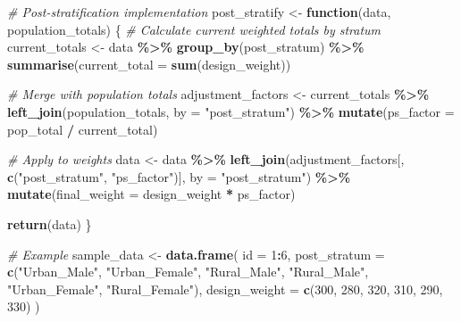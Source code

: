 \documentclass[
]{article}
\newenvironment{Shaded}{\begin{snugshade}}{\end{snugshade}}
\newcommand{\AttributeTok}[1]{\textcolor[rgb]{0.13,0.29,0.53}{#1}}
\newcommand{\CommentTok}[1]{\textcolor[rgb]{0.56,0.35,0.01}{\textit{#1}}}
\newcommand{\ControlFlowTok}[1]{\textcolor[rgb]{0.13,0.29,0.53}{\textbf{#1}}}
\newcommand{\DecValTok}[1]{\textcolor[rgb]{0.00,0.00,0.81}{#1}}
\newcommand{\FunctionTok}[1]{\textcolor[rgb]{0.13,0.29,0.53}{\textbf{#1}}}
\newcommand{\NormalTok}[1]{#1}
\newcommand{\OtherTok}[1]{\textcolor[rgb]{0.56,0.35,0.01}{#1}}
\newcommand{\SpecialCharTok}[1]{\textcolor[rgb]{0.81,0.36,0.00}{\textbf{#1}}}
\newcommand{\StringTok}[1]{\textcolor[rgb]{0.31,0.60,0.02}{#1}}
\begin{document}
\begin{Shaded}
\begin{Highlighting}[]
\CommentTok{\# Post{-}stratification implementation}
\NormalTok{post\_stratify }\OtherTok{\textless{}{-}} \ControlFlowTok{function}\NormalTok{(data, population\_totals) \{}
  \CommentTok{\# Calculate current weighted totals by stratum}
\NormalTok{  current\_totals }\OtherTok{\textless{}{-}}\NormalTok{ data }\SpecialCharTok{\%\textgreater{}\%}
    \FunctionTok{group\_by}\NormalTok{(post\_stratum) }\SpecialCharTok{\%\textgreater{}\%}
    \FunctionTok{summarise}\NormalTok{(}\AttributeTok{current\_total =} \FunctionTok{sum}\NormalTok{(design\_weight))}
  
  \CommentTok{\# Merge with population totals}
\NormalTok{  adjustment\_factors }\OtherTok{\textless{}{-}}\NormalTok{ current\_totals }\SpecialCharTok{\%\textgreater{}\%}
    \FunctionTok{left\_join}\NormalTok{(population\_totals, }\AttributeTok{by =} \StringTok{"post\_stratum"}\NormalTok{) }\SpecialCharTok{\%\textgreater{}\%}
    \FunctionTok{mutate}\NormalTok{(}\AttributeTok{ps\_factor =}\NormalTok{ pop\_total }\SpecialCharTok{/}\NormalTok{ current\_total)}
  
  \CommentTok{\# Apply to weights}
\NormalTok{  data }\OtherTok{\textless{}{-}}\NormalTok{ data }\SpecialCharTok{\%\textgreater{}\%}
    \FunctionTok{left\_join}\NormalTok{(adjustment\_factors[, }\FunctionTok{c}\NormalTok{(}\StringTok{"post\_stratum"}\NormalTok{, }\StringTok{"ps\_factor"}\NormalTok{)], }
              \AttributeTok{by =} \StringTok{"post\_stratum"}\NormalTok{) }\SpecialCharTok{\%\textgreater{}\%}
    \FunctionTok{mutate}\NormalTok{(}\AttributeTok{final\_weight =}\NormalTok{ design\_weight }\SpecialCharTok{*}\NormalTok{ ps\_factor)}
  
  \FunctionTok{return}\NormalTok{(data)}
\NormalTok{\}}

\CommentTok{\# Example}
\NormalTok{sample\_data }\OtherTok{\textless{}{-}} \FunctionTok{data.frame}\NormalTok{(}
  \AttributeTok{id =} \DecValTok{1}\SpecialCharTok{:}\DecValTok{6}\NormalTok{,}
  \AttributeTok{post\_stratum =} \FunctionTok{c}\NormalTok{(}\StringTok{"Urban\_Male"}\NormalTok{, }\StringTok{"Urban\_Female"}\NormalTok{, }\StringTok{"Rural\_Male"}\NormalTok{,}
                   \StringTok{"Rural\_Male"}\NormalTok{, }\StringTok{"Urban\_Female"}\NormalTok{, }\StringTok{"Rural\_Female"}\NormalTok{),}
  \AttributeTok{design\_weight =} \FunctionTok{c}\NormalTok{(}\DecValTok{300}\NormalTok{, }\DecValTok{280}\NormalTok{, }\DecValTok{320}\NormalTok{, }\DecValTok{310}\NormalTok{, }\DecValTok{290}\NormalTok{, }\DecValTok{330}\NormalTok{)}
\NormalTok{)}


\end{Highlighting}
\end{Shaded}
\end{document}
